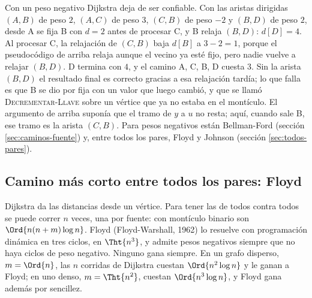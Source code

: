 \documentclass[11pt,letterpaper]{article}
\begin{document}
\begin{ojo}
  Con un peso negativo Dijkstra deja de ser confiable. Con las aristas
  dirigidas $(A, B)$ de peso $2$, $(A, C)$ de peso $3$, $(C, B)$ de
  peso $-2$ y $(B, D)$ de peso $2$, desde A se fija B con $d = 2$
  antes de procesar C, y B relaja $(B, D)$: $d[D] = 4$. Al procesar
  C, la relajación de $(C, B)$ baja $d[B]$ a $3 - 2 = 1$, porque el
  pseudocódigo de arriba relaja aunque el vecino ya esté fijo, pero
  nadie vuelve a relajar $(B, D)$. D termina con $4$, y el camino A,
  C, B, D cuesta $3$. Sin la arista $(B, D)$ el resultado final es
  correcto gracias a esa relajación tardía; lo que falla es que B se
  dio por fija con un valor que luego cambió, y que se llamó
  \textsc{Decrementar-Llave} sobre un vértice que ya no estaba en el
  montículo. El argumento de arriba suponía que el tramo de $y$ a $u$
  no resta; aquí, cuando sale B, ese tramo es la arista $(C, B)$. Para
  pesos negativos están Bellman-Ford (sección \ref{sec:caminos-fuente})
  y, entre todos los pares, Floyd y Johnson (sección
  \ref{sec:todos-pares}).
\end{ojo}


\subsection*{Camino más corto entre todos los pares: Floyd}

Dijkstra da las distancias desde un vértice. Para tener las de todos
contra todos se puede correr $n$ veces, una por fuente: con montículo
binario son $\Ord{n (n + m) \log n}$. Floyd (Floyd-Warshall, 1962) lo
resuelve con programación dinámica en tres ciclos, en $\Tht{n^3}$, y
admite pesos negativos siempre que no haya ciclos de peso negativo.
Ninguno gana siempre. En un grafo disperso, $m = \Ord{n}$, las $n$
corridas de Dijkstra cuestan $\Ord{n^2 \log n}$ y le ganan a Floyd; en
uno denso, $m = \Tht{n^2}$, cuestan $\Ord{n^3 \log n}$, y Floyd gana
además por sencillez.
\end{document}
